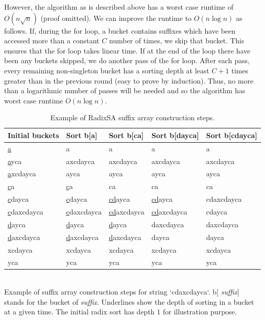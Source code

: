 However, the algorithm as is described above has a worst case runtime of $O(n\sqrt{n})$ (proof omitted).  
We can improve the runtime to $O(n\log n)$ as follows. If, during the for loop, a bucket contains 
suffixes which have been accessed more than a constant $C$ number of times, we skip that bucket.
This ensures that the for loop takes linear time.
If at the end of the loop there have been any buckets skipped, we do another pass
of the for loop. After each pass, every remaining non-singleton bucket has
a sorting depth at least $C+1$ times greater than in the previous round (easy to prove
by induction). Thus, no more than a logarithmic number of passes will be needed and so
the algorithm has worst case runtime $O(n\log n)$. 


\begin{table}
\caption{Example of RadixSA suffix array construction steps.}
\label{table_example}
\begin{tabular}{| l | l | l | l | l |}
\hline
{ Initial buckets} &{ Sort b[a]} & { Sort b[ca]} &{ Sort b[dayca]}    &{ Sort b[cdayca]} \\
\hline
{\underline{a}}& a & a & a & a \\
\cline{2-5}
{\underline{a}}yca& axcdayca & axcdayca & axcdayca & axcdayca \\
\cline{2-5}
{\underline{a}}xcdayca& ayca & ayca & ayca & ayca \\
\hline
{\underline{c}}a&{\underline{c}}a& ca & ca & ca \\
\cline{3-5}
{\underline{c}}dayca&{\underline{c}}dayca&{\underline{cd}}ayca&{\underline{cd}}ayca& cdaxcdayca \\
\cline{5-5}
{\underline{c}}daxcdayca&{\underline{c}}daxcdayca&{\underline{cd}}axcdayca&{\underline{cd}}axcdayca& cdayca\\
\hline
{\underline{d}}ayca&{\underline{d}}ayca&{\underline{d}}ayca& daxcdayca & daxcdayca\\
\cline{4-5}
{\underline{d}}axcdayca&{\underline{d}}axcdayca&{\underline{d}}axcdayca& dayca&
dayca\\
\hline
xcdayca& xcdayca & xcdayca & xcdayca & xcdayca \\
\hline
 yca & yca & yca & yca & yca \\
\hline
\end{tabular}\\
Example of suffix array construction steps for string `cdaxcdayca`. b[{\em
 suffix}] stands for the bucket of {\em suffix}. Underlines show the depth of
 sorting in a bucket at a given time. The
initial radix sort has depth $1$ for illustration purpose.
\end{table}


